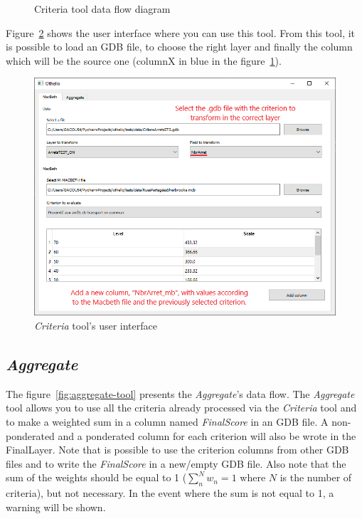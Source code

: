 \documentclass[11pt]{article}
\begin{document}
\begin{figure}[H]
    \centering
    
    \caption{Criteria tool data flow diagram}
    \label{fig:criteria-tool}
\end{figure}

Figure~\ref{fig:criteria-ui} shows the user interface where you can use this tool.
From this tool, it is possible to load an GDB file,
to choose the right layer and finally the column which will be the source one
(columnX in blue in the figure~\ref{fig:criteria-tool}).

\begin{figure}[H]
    \centering
    \includegraphics[width=.8\linewidth]{../images/criteria_tool.png}
    \caption{\textit{Criteria} tool's user interface}
    \label{fig:criteria-ui}
\end{figure}

\subsection{\textit{Aggregate}}\label{subsec:aggregate}

The figure\ \ref{fig:aggregate-tool} presents the \textit{Aggregate}'s data flow.
The \textit{Aggregate} tool allows you to use all the criteria
already processed via the \textit{Criteria} tool and to make a weighted
sum in a column named \textit{FinalScore} in an GDB file.
A non-ponderated and a ponderated column for each criterion will also be wrote in the FinalLayer.
Note that is possible to use the criterion columns from other GDB files and to write the
\textit{FinalScore} in a new/empty GDB file.
Also note that the sum of the weights should be equal to 1
($\sum_n^N w_n = 1$ where $N$ is the number of criteria), but not necessary.
In the event where the sum is not equal to 1, a warning will be shown.
\end{document}
